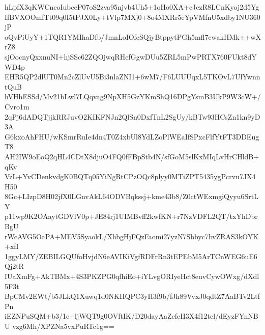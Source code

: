 hLpfX3qKWCneoIubceP07oS2zva95njvb4Uh5+1oHo0XA+cJczR8LCnKyoj2d5Yg
IfBVXOOmfTt09q0I5tPJX0Ly+tVlp7MXj0+8o4MXRr5eYpVMfnU5xdby1NU360jP
oQvPiUyY+1TQR1YMIhaDfb/JmnLoIOfeSQjyBtppytPGh5mfl7ewakHMk++wXrZ8
sjOocnyQxxnuNI+hjSSc62ZQOjwqRHefGgwDUu5ZRL5mPwPRTX760FUkt8dYWD4p
EHR5QP2dlUT0Mn2cZlUvU5Bi3nlaZNI1+6wM7/F6LUUUqxL5TKOvL7UlYwnntQuB
hVHhESSd/Mv21bLwl7LQqvag9NpXH5GzYKmShQ16DPgYsmB3UkP9W3cW+/Cvro1m
2qPj6dADQTjjkRRJuvO2KIKFNJn2QlSn0DxfTnL2SgUy/kBTw93HCsZn1kn9yD3A
G6kxoAhFHU/wKSmrRuIe4dn4T0Z4xbUl8YdLZoPlWEaIfSPxcFlfYtFT3DDEugT8
AH2IW9oEoQ2qHL4CDtX8djuO4FQ0fFBpStb4N/sfGoM5slKxMIqLvHrCHldB+qKv
VzL+YvCDenkvdgK0BQTq05YiNgRtCPzOQc8plyy0MTiZPT5435ygPcrvu7JX4H50
8Gc+LIzpD8H02jfX0LGnvAkL64ODVBqkssj+kme43b8/Z0ctWExmgiQyyu6SrtLY
p11wp9K2OAaytGDVlV0p+JE84rj1UIMBvff2kwfKN+r7NzVDFL2QT/txYhDbrBgU
rWcAVG5OaPA+MEV5SyaokL/XhbgHjFQzFaomi27yzN7Sbbyc7bvZRAS3kOYK+xfI
1ggyLMY/ZEBILGQUfoHvjdN6eAVIKiVgfRDFrRn3tEPEbM5ArTCnWEG6uE6Qj2tR
IUaXmFg+AkTBMx+4S3PKZPG0qfhiEo+iYLvgORIyeHct8euvCywOWxg/dXdl5F3t
BpCMv2EWt/b5JLkQ1Xuwq1d0NKHQPC3yH3f9b/fJh89VvxJ0qdtZ7AaBTv2LtfPn
iEZNPuSQM+b3/1e+ljWQT9g0OVftIK/D20dayAaZefeH3X4f12tel/dEyzFYnNBU
vzg6Mh/XPZNa5vxPuRTc1g==
